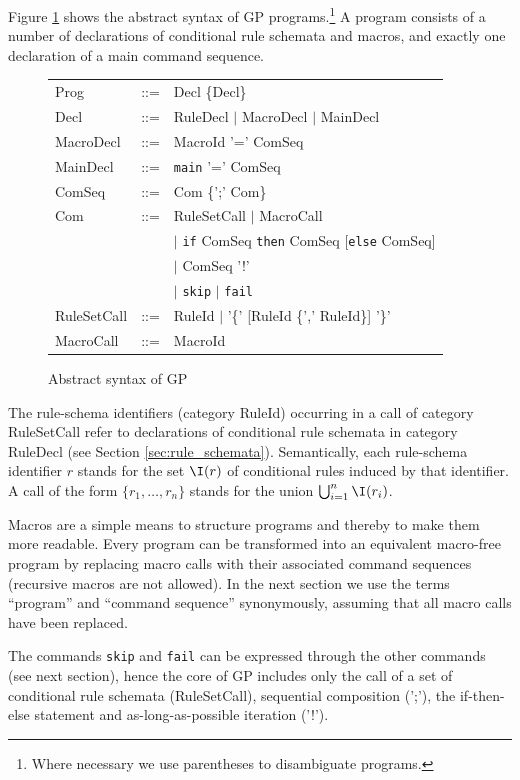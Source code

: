 Figure \ref{fig:program_syntax} shows the abstract syntax of GP programs.\footnote{Where necessary we use parentheses to disambiguate programs.} A program consists of a number of declarations of conditional rule schemata and macros, and exactly one declaration of a main command sequence. 
\begin{figure}[tb]
\renewcommand{\arraystretch}{1.2}
\begin{center}
\begin{tabular}{lcl}
Prog & ::= & Decl \{Decl\} \\
Decl & ::= & RuleDecl $\mid$ MacroDecl $\mid$ MainDecl \\
MacroDecl & ::= & MacroId '=' ComSeq \\
MainDecl & ::= & \texttt{main} '=' ComSeq \\
ComSeq & ::= & Com \{';' Com\} \\
Com & ::= & RuleSetCall $\mid$ MacroCall \\
&& $\mid$ \texttt{if} ComSeq \texttt{then} ComSeq [\texttt{else} ComSeq] \\
&& $\mid$ ComSeq '!' \\
&& $\mid$ \texttt{skip} $\mid$ \texttt{fail} \\
RuleSetCall & ::= & RuleId $\mid$ '\{' [RuleId \{',' RuleId\}] '\}' \\
MacroCall & ::= & MacroId 
\end{tabular}
\end{center}
\caption{Abstract syntax of GP}\label{fig:program_syntax}
\end{figure}
The rule-schema identifiers (category RuleId) occurring in a call of category RuleSetCall refer to declarations of conditional rule schemata in category RuleDecl (see Section \ref{sec:rule_schemata}). Semantically, each rule-schema identifier $r$ stands for the set  $\I(r)$ of conditional rules induced by that identifier. A call of the form $\{r_1,\dots,r_n\}$ stands for the union $\bigcup_{i=1}^n\I(r_i)$.

Macros are a simple means to structure programs and thereby to make them more readable. Every program can be transformed into an equivalent macro-free program by replacing macro calls with their associated command sequences (recursive macros are not allowed). In the next section we use the terms ``program'' and ``command sequence'' synonymously, assuming that all macro calls have been replaced. 

The commands \texttt{skip} and \texttt{fail} can be expressed through the other commands (see next section), hence the core of GP includes only the call of a set of conditional rule schemata (RuleSetCall), sequential composition (';'), the if-then-else statement and as-long-as-possible iteration ('!'). 
